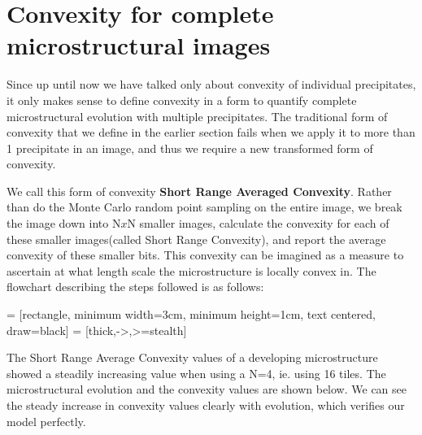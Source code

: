 \documentclass[12pt, a4paper]{report}
\begin{document}
\section{Convexity for complete microstructural images}
Since up until now we have talked only about convexity of individual precipitates, it only makes sense to define convexity in a form to quantify complete microstructural evolution with multiple precipitates. The traditional form of convexity that we define in the earlier section fails when we apply it to more than 1 precipitate in an image, and thus we require a new transformed form of convexity. 

We call this form of convexity \textbf{Short Range Averaged Convexity}. Rather than do the Monte Carlo random point sampling on the entire image, we break the image down into N$x$N smaller images, calculate the convexity for each of these smaller images(called Short Range Convexity), and report the average convexity of these smaller bits. This convexity can be imagined as a measure to ascertain at what length scale the microstructure is locally convex in. The flowchart describing the steps followed is as follows:

\usetikzlibrary{shapes.geometric, arrows}
 = [rectangle, minimum width=3cm, minimum height=1cm, text centered, draw=black]
 = [thick,->,>=stealth]
\begin{center}
\end{center}

The Short Range Average Convexity values of a developing microstructure showed a steadily increasing value when using a N=4, ie. using 16 tiles. The microstructural evolution and the convexity values are shown below. We can see the steady increase in convexity values clearly with evolution, which verifies our model perfectly.
\end{document}

